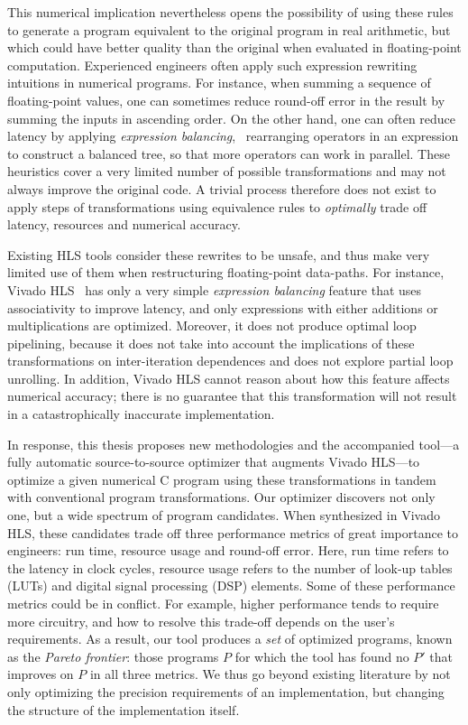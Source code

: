 This numerical implication nevertheless opens the possibility of using
these rules to generate a program equivalent to the original program in
real arithmetic, but which could have better quality than the original when
evaluated in floating-point computation.  Experienced engineers often apply
such expression rewriting intuitions in numerical programs.  For instance,
when summing a sequence of floating-point values, one can sometimes reduce
round-off error in the result by summing the inputs in ascending order.  On
the other hand, one can often reduce latency by applying \emph{expression
balancing}, \ie~rearranging operators in an expression to construct a balanced
tree, so that more operators can work in parallel.  These heuristics cover a
very limited number of possible transformations and may not always improve the
original code.  A trivial process therefore does not exist to apply steps of
transformations using equivalence rules to \emph{optimally} trade off latency,
resources and numerical accuracy.

Existing HLS tools consider these rewrites to be unsafe, and thus make very
limited use of them when restructuring floating-point data-paths.  For
instance, Vivado HLS~\cite{vivado_hls} has only a very simple \emph{expression
balancing} feature that uses associativity to improve latency, and only
expressions with either additions or multiplications are optimized.  Moreover,
it does not produce optimal loop pipelining, because it does not take
into account the implications of these transformations on inter-iteration
dependences and does not explore partial loop unrolling.  In addition, Vivado
HLS cannot reason about how this feature affects numerical accuracy; there is
no guarantee that this transformation will not result in a catastrophically
inaccurate implementation.

In response, this thesis proposes new methodologies and the accompanied
tool---a fully automatic source-to-source optimizer that augments Vivado
HLS---to optimize a given numerical C program using these transformations in
tandem with conventional program transformations.  Our optimizer discovers
not only one, but a wide spectrum of program candidates.  When synthesized
in Vivado HLS, these candidates trade off three performance metrics of great
importance to engineers: run time, resource usage and round-off error.  Here,
run time refers to the latency in clock cycles, resource usage refers to
the number of look-up tables (LUTs) and digital signal processing (DSP)
elements.  Some of these performance metrics could be in conflict.  For
example, higher performance tends to require more circuitry, and how to
resolve this trade-off depends on the user's requirements.  As a result, our
tool produces a \emph{set} of optimized programs, known as the \emph{Pareto
frontier}: those programs $P$ for which the tool has found no $P'$ that
improves on $P$ in all three metrics.  We thus go beyond existing literature
by not only optimizing the precision requirements of an implementation, but
changing the structure of the implementation itself.

